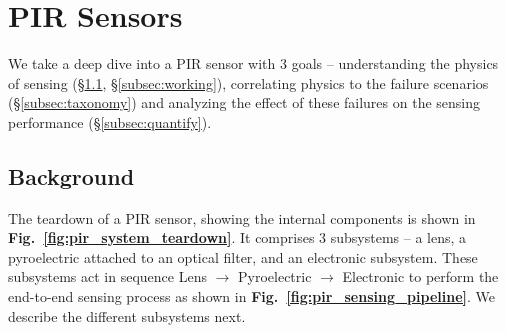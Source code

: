
\section{PIR Sensors}
\label{sec:approach}
We take a deep dive into a PIR sensor with 3 goals -- \ca understanding the physics of sensing (\S\ref{subsec:physics}, \S\ref{subsec:working}), \cb correlating physics to the failure scenarios (\S\ref{subsec:taxonomy}) and \cc analyzing the effect of these failures on the sensing performance (\S\ref{subsec:quantify}).


\subsection{Background}
\label{subsec:physics}
The teardown of a PIR sensor, showing the internal components is shown in {\bfseries Fig.~\ref{fig:pir_system_teardown}}.
It comprises 3 subsystems -- \ca a lens, \cb a pyroelectric attached to an optical filter, and \cc an electronic subsystem.
These subsystems act in sequence \ie Lens $\rightarrow$ Pyroelectric $\rightarrow$ Electronic to perform the end-to-end sensing process as shown in {\bfseries Fig.~\ref{fig:pir_sensing_pipeline}}. We describe the different subsystems next.

